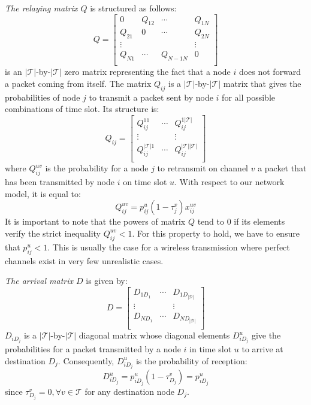 \documentclass[a4paper]{article}
\newcommand{\T}{\mathcal{T}}
\newcommand{\D}{\mathcal{D}}
\newcommand{\Qmatrix}{Q}
\newcommand{\Rmatrix}{D}
\newcommand{\Qe}[4]{\Qmatrix_{#1#2}^{#3#4}}
\newcommand{\Qd}[4]{\Rmatrix_{#1#2}^{#3#4}}
\begin{document}
\emph{The relaying matrix $\Qmatrix$} is structured as follows:
\[
\Qmatrix = \left[
\begin{array}{cccc}
0			& \Qe{1}{2}{}{}	&	\cdots	& \Qe{1}{N}{}{} \\
\Qe{2}{1}{}{}	& 0			&	\cdots	& \Qe{2}{N}{}{} \\
\vdots		& 			&			& \vdots \\
\Qe{N}{1}{}{}	& \cdots		&	 \Qe{N-1}{N}{}{} 	& 0\\
\end{array}
\right]
\]
 is an $|\T|$-by-$|\T|$ zero matrix representing the fact that a node $i$ does not forward a packet coming from itself. The matrix $\Qe{i}{j}{}{}$ is a $|\T|$-by-$|\T|$ matrix that gives the probabilities of node $j$ to transmit a packet sent by node $i$ for all possible combinations of time slot. Its structure is:
\begin{equation}
\Qe{i}{j}{}{} = \left[
\begin{array}{ccc}
\Qe{i}{j}{1}{1}	&	\cdots	& \Qe{i}{j}{1}{|\T|} \\
\vdots		& 			&	 \vdots \\
\Qe{i}{j}{|\T|}{1}& 	\cdots	&	 \Qe{i}{j}{|\T|}{|\T|} \\
\end{array}
\right]
\label{eq:relaying2}
\end{equation}
\noindent where $\Qe{i}{j}{u}{v}$ is the probability for a node $j$ to retransmit on channel $v$ a packet that has been transmitted by node $i$ on time slot $u$. With respect to our network model, it is equal to:
\[\Qe{i}{j}{u}{v} = p_{ij}^{u} (1-\tau_j^v) x_{ij}^{uv}\] 
It is important to note that the powers of matrix $\Qmatrix$ tend to 0 if its elements verify the strict inequality $\Qe{i}{j}{u}{v} <1$. For this property to hold, we have to ensure that $p_{ij}^{u}<1$. This is usually the case for a wireless transmission where perfect channels exist in very few unrealistic cases.

\emph{The arrival matrix $\Rmatrix$} is given by:
\[
\Rmatrix = \left[
\begin{array}{ccc}
\Qd{1}{D_1}{}{}	& \cdots 	& 	\Qd{1}{D_{|\D|}}{}{} \\
\vdots		&		&	\vdots	\\
\Qd{N}{D_1}{}{}	& \cdots 	& 	\Qd{N}{D_{|\D|}}{}{} \\
\end{array}
\right]
\]
\noindent $\Qd{i}{D_j}{}{}$ is a $|\T|$-by-$|\T|$ diagonal matrix whose diagonal elements $\Qd{i}{D_j}{u}{}$ give the probabilities for a packet transmitted by a node $i$ in time slot $u$ to arrive at destination $D_j$.  Consequently, $\Qd{i}{D_j}{u}{}$ is the probability of reception:
\[\Qd{i}{D_j}{u}{}=p_{iD_j}^{u} (1-\tau_{D_j}^v) =p_{iD_j}^{u} \]
\noindent since $\tau_{D_j}^v=0, \forall v \in \T$ for any destination node $D_j$.
\end{document}
